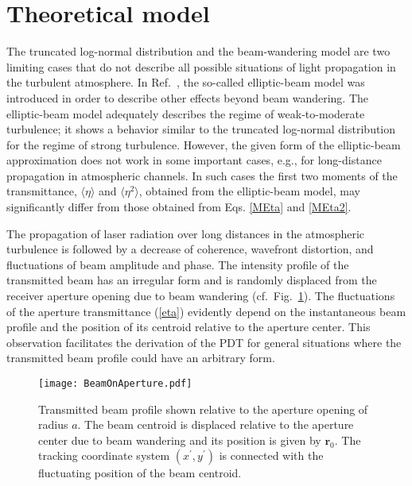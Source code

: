 \documentclass[aps,pra,twocolumn,a4paper,nofootinbib,preprintnumbers] {revtex4-1}
\begin{document}

\section{Theoretical model}\label{sec:TheoreticalModel}

	The truncated log-normal distribution and the beam-wandering model are two limiting cases that do not describe all possible situations of light propagation in the turbulent atmosphere.
	In Ref.~\cite{Vasylyev2016}, the so-called elliptic-beam model was introduced in order to describe other effects beyond beam wandering.
	The elliptic-beam model adequately describes the regime of weak-to-moderate turbulence; it shows a behavior similar to the truncated log-normal  distribution for the regime of strong  turbulence.
	However, the given form of the elliptic-beam approximation does not  work  in some important cases, e.g., for long-distance propagation in atmospheric channels.
	In such cases the first two moments of the transmittance, $\langle\eta\rangle$ and $\langle\eta^2\rangle$, obtained from the elliptic-beam model, may significantly differ from those obtained from Eqs. \eqref{MEta} and  \eqref{MEta2}.
	

	The propagation of laser radiation over long distances in the atmospheric turbulence is followed by a decrease of coherence, wavefront distortion, and fluctuations of  beam amplitude and phase.
	The intensity profile  of the transmitted beam has an irregular form and is randomly displaced from the receiver aperture opening due to beam wandering (cf.~Fig.~\ref{fig:Beam}).
	The fluctuations of the aperture transmittance (\ref{eta}) evidently depend on the instantaneous beam profile and the position of its centroid relative to the aperture center.
	This observation facilitates the derivation of the PDT for general situations where the transmitted beam profile could have an arbitrary form.

		\begin{figure}[ht]
		\texttt{[image: BeamOnAperture.pdf]}
		\caption{\label{fig:Beam} Transmitted beam profile shown relative to the aperture opening of radius $a$.
		The beam centroid is displaced relative to the  aperture center due to beam wandering and its position is given by $\boldsymbol{r}_0$.
		The tracking coordinate system $(x^\prime,y^\prime)$ is connected with the fluctuating position of the beam centroid.	}
		\end{figure}
\end{document}
